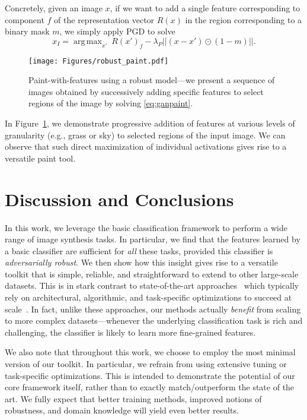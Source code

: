 \documentclass{article}
\DeclareMathOperator*{\argmax}{arg\,max}
\begin{document}
{Concretely, given an
image $x$, if we want to add a single feature corresponding to component $f$ of
the representation vector $R (x)$ in the region corresponding to a binary mask
$m$, we simply apply PGD to solve
\begin{equation}
x_I = {\argmax}_{x'}\ R(x')_f - \lambda_P || (x - x') \odot (1 - m)||.
\label{eq:ganpaint}
\end{equation}
\begin{figure}[!h]
	\texttt{[image: Figures/robust\_paint.pdf]}
	\caption{Paint-with-features using a robust model---we present a
	sequence of images obtained by successively adding specific features to 
    select regions of the image by solving \eqref{eq:ganpaint}.}
	\label{fig:robpaint}
\end{figure}
In Figure~\ref{fig:robpaint}, we demonstrate progressive addition of features at various levels of
granularity (e.g., grass or sky) to selected regions of the input image. We can observe that
such direct maximization of individual activations gives rise to a versatile
paint tool. 
 
\section{Discussion and Conclusions}
In this work, we leverage the basic classification framework to perform a wide
range of image synthesis tasks. In particular, we find that the features learned
by a basic classifier are sufficient for {\em all} these tasks, provided this
classifier is {\em adversarially robust}. We then show how this insight gives
rise to a versatile toolkit that is simple, reliable, and
straightforward to extend to other large-scale datasets. This is in stark contrast
to state-of-the-art
approaches~\cite{goodfellow2014generative,karras2018progressive,brock2019large}
which typically rely on architectural, algorithmic, and task-specific
optimizations to succeed at
scale~\cite{salimans2016improved,daskalakis2018training,miyato2018spectral}. In
fact, unlike these approaches, our methods actually {\em benefit} from scaling
to more complex datasets---whenever the underlying classification task is rich
and challenging, the classifier is likely to learn more fine-grained features.

We also note that throughout this work, we choose to employ the most minimal
version of our toolkit. In particular, we refrain from using extensive tuning or
task-specific optimizations. This is intended to demonstrate the potential of
our core framework itself, rather than to exactly match/outperform the state of
the art. We fully expect that better training methods, improved notions of
robustness, and domain knowledge will yield even better results.

}
\end{document}
